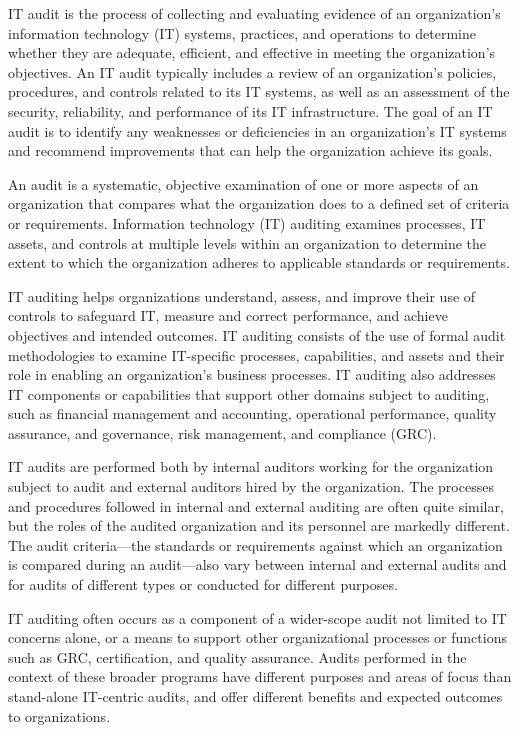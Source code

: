 IT audit is the process of collecting and evaluating evidence of an organization's information technology (IT) systems, practices, and operations to determine whether they are adequate, efficient, and effective in meeting the organization's objectives. An IT audit typically includes a review of an organization's policies, procedures, and controls related to its IT systems, as well as an assessment of the security, reliability, and performance of its IT infrastructure. The goal of an IT audit is to identify any weaknesses or deficiencies in an organization's IT systems and recommend improvements that can help the organization achieve its goals.

An audit is a systematic, objective examination of one or more aspects of an
organization that compares what the organization does to a defined set of criteria or requirements. Information technology (IT) auditing examines processes,
IT assets, and controls at multiple levels within an organization to determine the
extent to which the organization adheres to applicable standards or requirements. 

IT auditing helps organizations understand, assess, and improve
their use of controls to safeguard IT, measure and correct performance, and achieve
objectives and intended outcomes. IT auditing consists of the use of formal audit
methodologies to examine IT-specific processes, capabilities, and assets and their
role in enabling an organization’s business processes. IT auditing also addresses IT
components or capabilities that support other domains subject to auditing, such as
financial management and accounting, operational performance, quality assurance,
and governance, risk management, and compliance (GRC).



IT audits are performed both by internal auditors working for the organization
subject to audit and external auditors hired by the organization. The processes and
procedures followed in internal and external auditing are often quite similar, but the
roles of the audited organization and its personnel are markedly different. The audit
criteria—the standards or requirements against which an organization is compared
during an audit—also vary between internal and external audits and for audits of
different types or conducted for different purposes.


IT auditing often occurs as a component of a wider-scope audit not limited to IT concerns alone, or a means to support
other organizational processes or functions such as GRC, certification, and quality
assurance. Audits performed in the context of these broader programs have different
purposes and areas of focus than stand-alone IT-centric audits, and offer different
benefits and expected outcomes to organizations.

